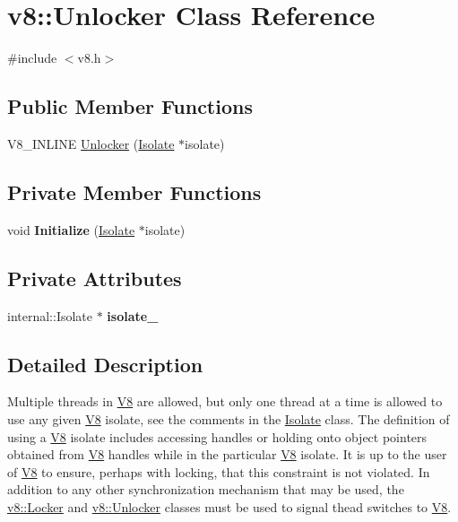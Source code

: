 \hypertarget{classv8_1_1_unlocker}{}\section{v8\+:\+:Unlocker Class Reference}
\label{classv8_1_1_unlocker}


{\ttfamily \#include $<$v8.\+h$>$}

\subsection*{Public Member Functions}
\begin{DoxyCompactItemize}
\item 
V8\+\_\+\+I\+N\+L\+I\+NE \hyperlink{classv8_1_1_unlocker_a2faeb117d7308b65ac85fdad390e4c1f}{Unlocker} (\hyperlink{classv8_1_1_isolate}{Isolate} $\ast$isolate)
\end{DoxyCompactItemize}
\subsection*{Private Member Functions}
\begin{DoxyCompactItemize}
\item 
void {\bfseries Initialize} (\hyperlink{classv8_1_1_isolate}{Isolate} $\ast$isolate)\hypertarget{classv8_1_1_unlocker_a20e9761b1b743edc6ac239c8ccbc6a59}{}\label{classv8_1_1_unlocker_a20e9761b1b743edc6ac239c8ccbc6a59}

\end{DoxyCompactItemize}
\subsection*{Private Attributes}
\begin{DoxyCompactItemize}
\item 
internal\+::\+Isolate $\ast$ {\bfseries isolate\+\_\+}\hypertarget{classv8_1_1_unlocker_a209c97250a5a400c3efaf125735cdea3}{}\label{classv8_1_1_unlocker_a209c97250a5a400c3efaf125735cdea3}

\end{DoxyCompactItemize}


\subsection{Detailed Description}
Multiple threads in \hyperlink{classv8_1_1_v8}{V8} are allowed, but only one thread at a time is allowed to use any given \hyperlink{classv8_1_1_v8}{V8} isolate, see the comments in the \hyperlink{classv8_1_1_isolate}{Isolate} class. The definition of \textquotesingle{}using a \hyperlink{classv8_1_1_v8}{V8} isolate\textquotesingle{} includes accessing handles or holding onto object pointers obtained from \hyperlink{classv8_1_1_v8}{V8} handles while in the particular \hyperlink{classv8_1_1_v8}{V8} isolate. It is up to the user of \hyperlink{classv8_1_1_v8}{V8} to ensure, perhaps with locking, that this constraint is not violated. In addition to any other synchronization mechanism that may be used, the \hyperlink{classv8_1_1_locker}{v8\+::\+Locker} and \hyperlink{classv8_1_1_unlocker}{v8\+::\+Unlocker} classes must be used to signal thead switches to \hyperlink{classv8_1_1_v8}{V8}.

